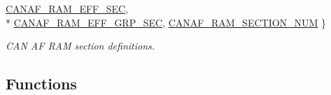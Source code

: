 \begin{DoxyCompactItemize}
\hyperlink{group__CAN__17XX__40XX_ggaf0ae33e71a7acfc561972811aa1207e8a1d1b4c4406c8913e08d9edba297f9d34}{C\+A\+N\+A\+F\+\_\+\+R\+A\+M\+\_\+\+E\+F\+F\+\_\+\+S\+EC}, 
\\*
\hyperlink{group__CAN__17XX__40XX_ggaf0ae33e71a7acfc561972811aa1207e8a3a869c6db7177da7b55a903b051775c1}{C\+A\+N\+A\+F\+\_\+\+R\+A\+M\+\_\+\+E\+F\+F\+\_\+\+G\+R\+P\+\_\+\+S\+EC}, 
\hyperlink{group__CAN__17XX__40XX_ggaf0ae33e71a7acfc561972811aa1207e8a367c14b1175c83cd2ed218b1cb23b010}{C\+A\+N\+A\+F\+\_\+\+R\+A\+M\+\_\+\+S\+E\+C\+T\+I\+O\+N\+\_\+\+N\+UM}
 \}\begin{DoxyCompactList}\small\item\em C\+AN AF R\+AM section definitions. \end{DoxyCompactList}
\end{DoxyCompactItemize}
\subsection*{Functions}
